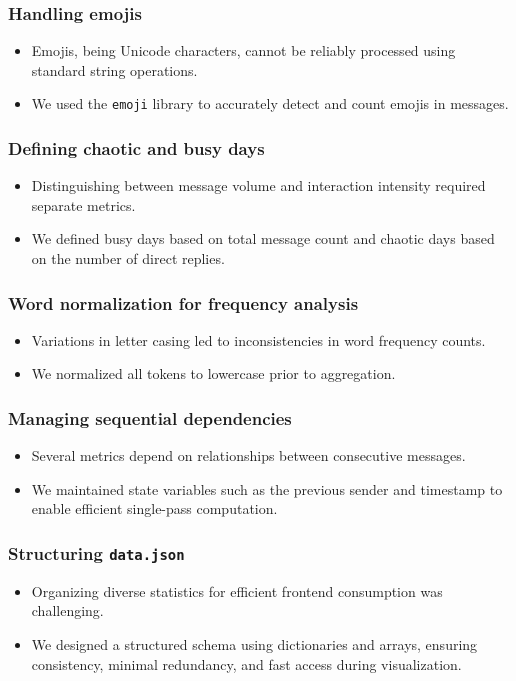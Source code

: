 \documentclass[11pt,a4paper]{article}
\begin{document}
\subsubsection{Handling emojis}
\begin{itemize}
\item Emojis, being Unicode characters, cannot be reliably processed using standard string operations.
\item We used the \texttt{emoji} library to accurately detect and count emojis in messages.
\end{itemize}

\subsubsection{Defining chaotic and busy days}
\begin{itemize}
\item Distinguishing between message volume and interaction intensity required separate metrics.
\item We defined busy days based on total message count and chaotic days based on the number of direct replies.
\end{itemize}

\subsubsection{Word normalization for frequency analysis}
\begin{itemize}
\item Variations in letter casing led to inconsistencies in word frequency counts.
\item We normalized all tokens to lowercase prior to aggregation.
\end{itemize}

\subsubsection{Managing sequential dependencies}
\begin{itemize}
\item Several metrics depend on relationships between consecutive messages.
\item We maintained state variables such as the previous sender and timestamp to enable efficient single-pass computation.
\end{itemize}

\subsubsection{Structuring \texttt{data.json}}
\begin{itemize}
\item Organizing diverse statistics for efficient frontend consumption was challenging.
\item We designed a structured schema using dictionaries and arrays, ensuring consistency, minimal redundancy, and fast access during visualization.
\end{itemize}
\end{document}
